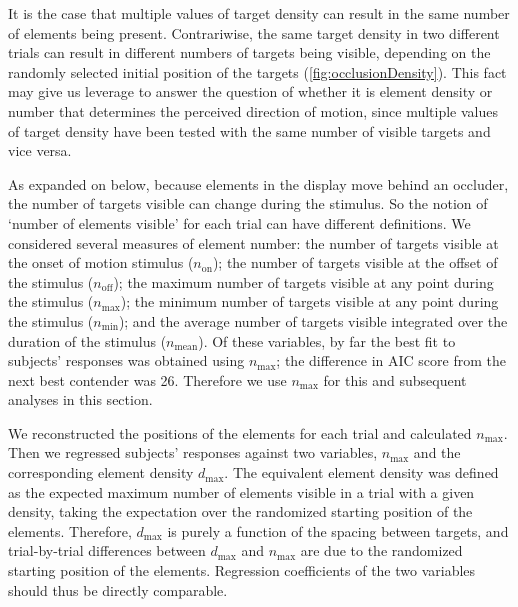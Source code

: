 \documentclass[../manuscript]{subfiles}
\begin{document}
It is the case that multiple values of target density can result in the same number of elements being present. Contrariwise, the same target density in two different trials can result in different numbers of targets being visible, depending on the randomly selected initial position of the targets (\autoref{fig:occlusionDensity}). This fact may give us leverage to answer the question of whether it is element density or number that determines the perceived direction of motion, since multiple values of target density have been tested with the same number of visible targets and vice versa.



As expanded on below, because elements in the display move behind an occluder, the number of targets visible can change during the stimulus. So the notion of `number of elements visible' for each trial can have different definitions. We considered several measures of element number: the number of targets visible at the onset of motion stimulus ($n_{\mathrm{on}}$); the number of targets visible at the offset of the stimulus ($n_{\mathrm{off}}$); the maximum number of targets visible at any point during the stimulus ($n_{\mathrm{max}}$); the minimum number of targets visible at any point during the stimulus ($n_{\mathrm{min}}$); and the average number of targets visible integrated over the duration of the stimulus ($n_\mathrm{mean}$). Of these variables, by far the best fit to subjects' responses was obtained using $n_{\mathrm{max}}$; the difference in AIC score from the next best contender was 26. Therefore we use $n_{\mathrm{max}}$ for this and subsequent analyses in this section.


We reconstructed the positions of the elements for each trial and calculated $n_\mathrm{max}$. Then we regressed subjects' responses against two variables, $n_{\mathrm{max}}$ and the corresponding element density $d_\mathrm{max}$. The equivalent element density was defined as the expected maximum number of elements visible in a trial with a given density, taking the expectation over the randomized starting position of the elements. Therefore, $d_\mathrm{max}$ is purely a function of the spacing between targets, and trial-by-trial differences between $d_\mathrm{max}$ and $n_\mathrm{max}$ are due to the randomized starting position of the elements. Regression coefficients of the two variables should thus be directly comparable.
\end{document}
